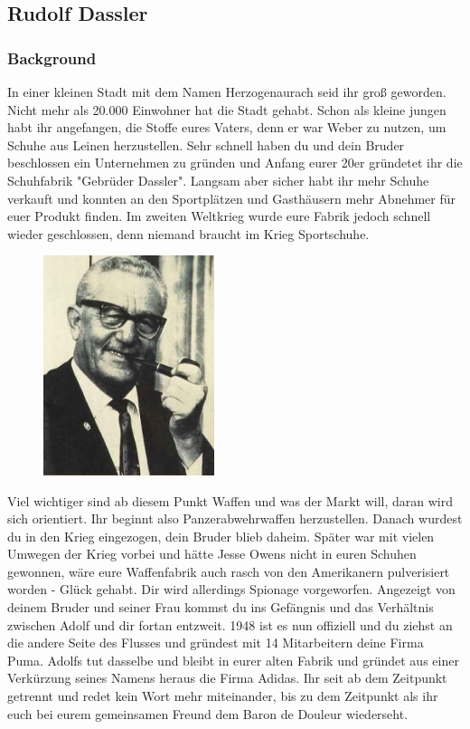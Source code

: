\documentclass[12pt, a4paper, openany]{report}
\begin{document}
\subsection{Rudolf Dassler}
\subsubsection{Background}
In einer kleinen Stadt mit dem Namen Herzogenaurach seid ihr groß geworden. Nicht mehr als 20.000 Einwohner hat die Stadt gehabt. Schon als kleine jungen habt ihr angefangen, die Stoffe eures Vaters, denn er war Weber zu nutzen, um Schuhe aus Leinen herzustellen. Sehr schnell haben du und dein Bruder beschlossen ein Unternehmen zu gründen und Anfang eurer 20er gründetet ihr die Schuhfabrik "Gebrüder Dassler". Langsam aber sicher habt ihr mehr Schuhe verkauft und konnten an den Sportplätzen und Gasthäusern mehr Abnehmer für euer Produkt finden. Im zweiten Weltkrieg wurde eure Fabrik jedoch schnell wieder geschlossen, denn niemand braucht im Krieg Sportschuhe. \\

\begin{figure}[h!]
\centering
\includegraphics[width=5cm]{Rudi_Dassler.jpg}
\end{figure}

Viel wichtiger sind ab diesem Punkt Waffen und was der Markt will, daran wird sich orientiert. Ihr beginnt also Panzerabwehrwaffen herzustellen. Danach wurdest du in den Krieg eingezogen, dein Bruder blieb daheim. Später war mit vielen Umwegen der Krieg vorbei und hätte Jesse Owens nicht in euren Schuhen gewonnen, wäre eure Waffenfabrik auch rasch von den Amerikanern pulverisiert worden - Glück gehabt. Dir wird allerdings Spionage vorgeworfen. Angezeigt von deinem Bruder und seiner Frau kommst du ins Gefängnis und das Verhältnis zwischen Adolf und dir fortan entzweit. 1948 ist es nun offiziell und du ziehst an die andere Seite des Flusses und gründest mit 14 Mitarbeitern deine Firma Puma. Adolfs tut dasselbe und bleibt in eurer alten Fabrik und gründet aus einer Verkürzung seines Namens heraus die Firma Adidas. Ihr seit ab dem Zeitpunkt getrennt und redet kein Wort mehr miteinander, bis zu dem Zeitpunkt als ihr euch bei eurem gemeinsamen Freund dem Baron de Douleur wiederseht. 
\end{document}
